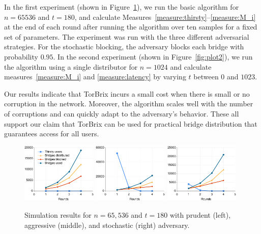 \documentclass[letterpaper,twocolumn,10pt]{article}
\newcommand{\sfsize}{\fontsize{0.73\baselineskip}{0.73\baselineskip}\selectfont}
\newcommand{\sans}[1]{\textsf{\sfsize \mbox{#1}}}
\newcommand{\brix}{\sans{TorBrix}\xspace}
\begin{document}
In the first experiment (shown in Figure~\ref{fig:plot1}), we run the basic algorithm for ${n=65536}$ and ${t=180}$, and calculate Measures~\ref{measure:thirsty}--\ref{measure:M_i} at the end of each round after running the algorithm over ten samples for a fixed set of parameters. The experiment was run with the three different adversarial strategies. For the stochastic blocking, the adversary blocks each bridge with probability $0.95$. %
In the second experiment (shown in Figure~\ref{fig:plot2}), we run the algorithm using a single distributor for ${n=1024}$ and calculate measures~\ref{measure:M_i} and \ref{measure:latency} by varying $t$ between $0$ and $1023$.

Our results indicate that \brix incurs a small cost when there is small or no corruption in the network. Moreover, the algorithm scales well with the number of corruptions and can quickly adapt to the adversary's behavior. These all support our claim that \brix can be used for practical bridge distribution that guarantees access for all users.

\begin{figure}[t]
	\hspace{-0.8em}\includegraphics[width=0.32\textwidth]{images/plot-prudent-65536.eps}
	\hspace{-0.5em}\includegraphics[width=0.32\textwidth]{images/plot-aggressive-65536.eps}
	\hspace{-0.5em}\includegraphics[width=0.32\textwidth]{images/plot-stochastic-65536.eps}
	\caption{Simulation results for ${n=65,536}$ and ${t=180}$ with prudent (left), aggressive (middle), and stochastic (right) adversary.}
	\label{fig:plot1} 
\end{figure}
\end{document}
